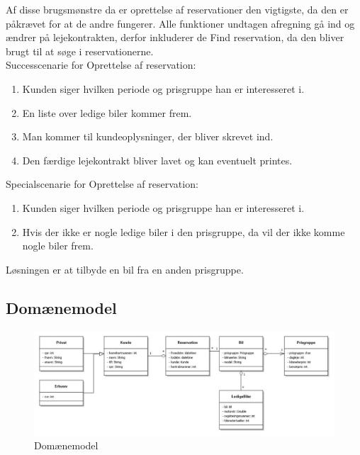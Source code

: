 \documentclass[11pt]{article}
\begin{document}
Af disse brugsmønstre da er oprettelse af reservationer den vigtigste, da den er påkrævet for at de andre fungerer. Alle funktioner undtagen afregning gå ind og ændrer på lejekontrakten, derfor inkluderer de Find reservation, da den bliver brugt til at søge i reservationerne.\\

Successcenarie for Oprettelse af reservation:
\begin{enumerate}
\item Kunden siger hvilken periode og prisgruppe han er interesseret i.
\item En liste over ledige biler kommer frem.
\item Man kommer til kundeoplysninger, der bliver skrevet ind.
\item Den færdige lejekontrakt bliver lavet og kan eventuelt printes.\\
\end{enumerate}

Specialscenarie for Oprettelse af reservation:
\begin{enumerate}
\item Kunden siger hvilken periode og prisgruppe han er interesseret i.
\item Hvis der ikke er nogle ledige biler i den prisgruppe, da vil der ikke komme nogle biler frem.
\end{enumerate}

Løsningen er at tilbyde en bil fra en anden prisgruppe. \\

\subsection*{Domænemodel}
\begin{figure}
  \centering
  \includegraphics[width=15cm]{CLASSDIAGRAM.jpg}
  \caption{Domænemodel}
  \label{fig:Domaenemodel}
\end{figure}
\end{document}

